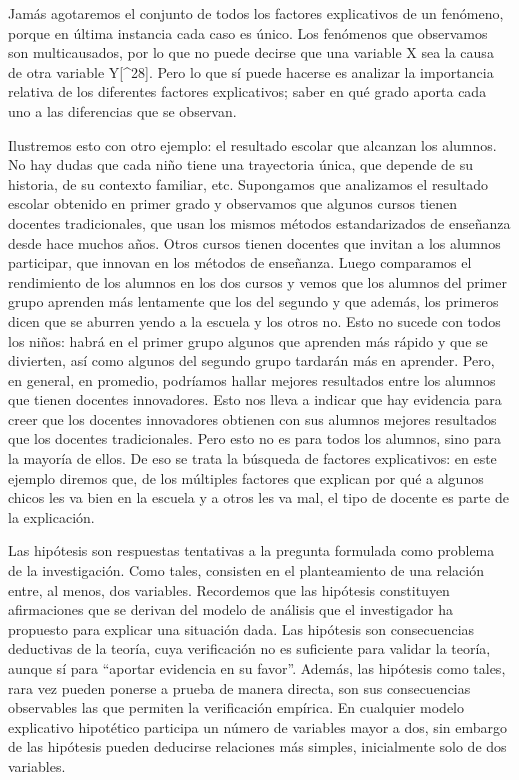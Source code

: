 \documentclass[]{book}
\begin{document}
Jamás agotaremos el conjunto de todos los factores explicativos de un
fenómeno, porque en última instancia cada caso es único. Los fenómenos que observamos son multicausados, por lo que no puede decirse que una
variable X sea la causa de otra variable Y{[}\^{}28{]}. Pero lo que sí
puede hacerse es analizar la importancia relativa de los diferentes
factores explicativos; saber en qué grado aporta cada uno a las
diferencias que se observan.

Ilustremos esto con otro ejemplo: el resultado escolar que alcanzan los alumnos. No hay dudas que cada niño tiene una trayectoria única, que depende de su historia, de su contexto familiar, etc. Supongamos que analizamos el resultado escolar obtenido en primer grado y observamos que algunos cursos tienen docentes tradicionales, que usan los mismos métodos estandarizados de enseñanza desde hace muchos años. Otros cursos tienen docentes que invitan a los alumnos participar, que innovan en los métodos de enseñanza. Luego comparamos el rendimiento de los alumnos en los dos cursos y vemos que los alumnos del primer grupo aprenden más lentamente que los del segundo y que además, los primeros dicen que se aburren yendo a la escuela y los otros no. Esto no sucede con todos los niños: habrá en el primer grupo algunos que aprenden más rápido y que se divierten, así como algunos del segundo grupo tardarán más en aprender. Pero, en general, en promedio, podríamos hallar mejores resultados entre los alumnos que tienen docentes innovadores. Esto nos lleva a indicar que hay evidencia para creer que los docentes innovadores obtienen con sus alumnos mejores resultados que los docentes tradicionales. Pero esto
no es para todos los alumnos, sino para la mayoría de ellos. De eso se trata la búsqueda de factores explicativos: en este ejemplo diremos que, de los múltiples factores que explican por qué a algunos chicos les va bien en la escuela y a otros les va mal, el tipo de docente es parte de la explicación.

Las hipótesis son respuestas tentativas a la pregunta formulada como
problema de la investigación. Como tales, consisten en el planteamiento de una relación entre, al menos, dos variables. Recordemos que las hipótesis constituyen afirmaciones que se derivan del modelo de análisis que el investigador ha propuesto para explicar una situación dada. Las hipótesis son consecuencias deductivas de la teoría, cuya verificación no es suficiente para validar la teoría, aunque sí para ``aportar evidencia en su favor''. Además, las hipótesis como tales, rara vez pueden ponerse a prueba de manera directa, son sus consecuencias observables las que permiten la verificación empírica. En cualquier modelo explicativo hipotético participa un número de variables mayor a dos, sin embargo de las hipótesis pueden deducirse relaciones más simples, inicialmente solo de dos variables.
\end{document}
